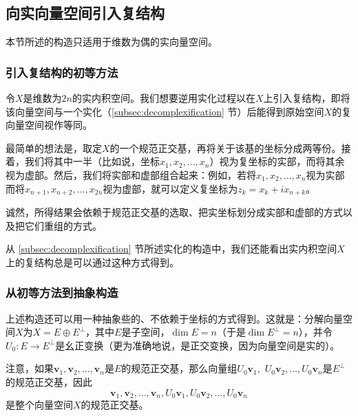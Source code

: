 \subsection{向实向量空间引入复结构}

本节所述的构造只适用于维数为偶的实向量空间。

\subsubsection{引入复结构的初等方法}

令$X$是维数为$2n$的实内积空间。我们想要逆用实化过程以在$X$上引入复结构，即将该向量空间与一个实化（\ref{subsec:decomplexification} 节）后能得到原始空间$X$的复向量空间视作等同。

最简单的想法是，取定$X$的一个规范正交基，再将关于该基的坐标分成两等份。接着，我们将其中一半（比如说，坐标$x_1,x_2,\dots,x_n$）视为复坐标的实部，而将其余视为虚部。然后，我们将实部和虚部组合起来：例如，若将$x_1,x_2,\dots,x_n$视为实部而将$x_{n+1},x_{n+2},\dots,x_{2n}$视为虚部，就可以定义复坐标为$z_k = x_k+ix_{n+k}$。

诚然，所得结果会依赖于规范正交基的选取、把实坐标划分成实部和虚部的方式以及把它们重组的方式。

从 \ref{subsec:decomplexification} 节所述实化的构造中，我们还能看出实内积空间$X$上的复结构总是可以通过这种方式得到。

\subsubsection{从初等方法到抽象构造}

上述构造还可以用一种抽象些的、不依赖于坐标的方式得到。这就是：分解向量空间$X$为$X = E\oplus E^\perp$，其中$E$是子空间，$\dim E = n$（于是$\dim E^\perp = n$），并令$U_0:E\to E^\perp$是幺正变换（更为准确地说，是正交变换，因为向量空间是实的）。

注意，如果$\mathbf{v}_1,\mathbf{v}_2,\ldots,\mathbf{v}_n$是$E$的规范正交基，那么向量组$U_0\mathbf{v}_1,$ $U_0\mathbf{v}_2,\ldots,U_0\mathbf{v}_n$是$E^\perp$的规范正交基，因此
\[\mathbf{v}_1,\mathbf{v}_2,\ldots,\mathbf{v}_n,U_0\mathbf{v}_1,U_0\mathbf{v}_2,\ldots,U_0\mathbf{v}_n\]
是整个向量空间$X$的规范正交基。


